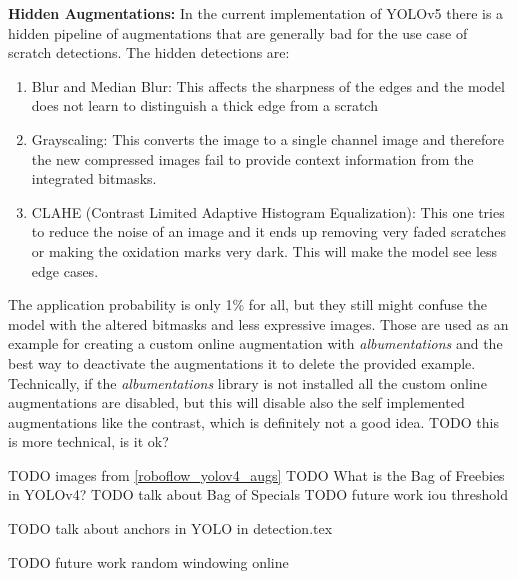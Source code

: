 \textbf{Hidden Augmentations:}
In the current implementation of YOLOv5 there is a hidden pipeline of augmentations that are generally bad for the use case of scratch detections. The hidden detections are:
\begin{enumerate}
\item Blur and Median Blur: This affects the sharpness of the edges and the model does not learn to distinguish a thick edge from a scratch
\item Grayscaling: This converts the image to a single channel image and therefore the new compressed images fail to provide context information from the integrated bitmasks.
\item CLAHE (Contrast Limited Adaptive Histogram Equalization): This one tries to reduce the noise of an image and it ends up removing very faded scratches or making the oxidation marks very dark. This will make the model see less edge cases. \\
\end{enumerate}
The application probability is only 1\% for all, but they still might confuse the model with the altered bitmasks and less expressive images. Those are used as an example for creating a custom online augmentation with \textit{albumentations} and the best way to deactivate the augmentations it to delete the provided example. Technically, if the \textit{albumentations} library is not installed all the custom online augmentations are disabled, but this will disable also the self implemented augmentations like the contrast, which is definitely not a good idea.
TODO this is more technical, is it ok?

TODO images from \ref{roboflow_yolov4_augs}
TODO What is the Bag of Freebies in YOLOv4?
TODO talk about Bag of Specials
TODO future work iou threshold

TODO talk about anchors in YOLO in detection.tex

TODO future work random windowing online

